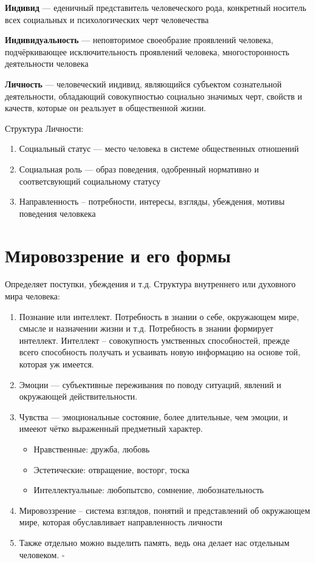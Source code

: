 \documentclass[12pt,a4paper]{book}
\begin{document}
\textbf{Индивид} --- еденичный представитель человеческого рода, конкретный носитель всех социальных и психологических черт человечества

\textbf{Индивидуальность} --- неповторимое своеобразие проявлений человека, подчёркивающее исключительность проявлений человека, многосторонность деятельности человека

\textbf{Личность} --- человеческий индивид, являющийся субъектом сознательной деятельности, обладающий совокупностью социально значимых черт, свойств и качеств, которые он реальзует в общественной жизни.

Структура Личности:
\begin{enumerate}
	\item Социальный статус --- место человека в системе общественных отношений
	\item Социальная роль --- образ поведения, одобренный нормативно и соответсвующий социальному статусу
	\item Направленность -- потребности, интересы, взгляды, убеждения, мотивы поведения человкека
\end{enumerate}
\section{Мировоззрение и его формы}
Определяет поступки, убеждения и т.д.
Структура внутреннего или духовного мира человека:
\begin{enumerate}
	\item Познание или интеллект. Потребность в знании о себе, окружающем мире, смысле и назначении жизни и т.д. Потребность в знании формирует интеллект. Интеллект -- совокупность умственных способностей, прежде всего способность получать и усваивать новую информацию на основе той, которая уж имеется.
	\item Эмоции --- субъективные переживания по поводу ситуаций, явлений и окружающей действительности.
	\item Чувства --- эмоциональные состояние, более длительные, чем эмоции, и имееют чётко выраженный предметный характер.
	\begin{itemize}
		\item Нравственные: дружба, любовь
		\item Эстетические: отвращение, восторг, тоска
		\item Интеллектуальные: любопытсво, сомнение, любознательность
	\end{itemize}
	\item Мировоззрение -- система взглядов, понятий и представлений об окружающем мире, которая обуславливает направленность личности
	\item Также отдельно можно выделить память, ведь она делает нас отдельным человеком.	-
\end{enumerate}
\end{document}
